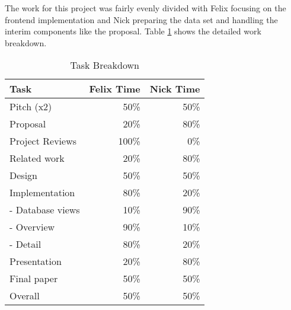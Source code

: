 \documentclass[../manifest.tex]{subfiles}
\begin{document}
The work for this project was fairly evenly divided with Felix focusing on the frontend implementation and Nick preparing the data set and handling the interim components like the proposal. Table \ref{tab:schedule} shows the detailed work breakdown.

\begin{table}[!thb]
  \caption{Task Breakdown}
  \label{tab:schedule}
  \begin{tabular*}{\columnwidth}{ l r r }
    \hline
    \textbf{Task} & \textbf{Felix Time} & \textbf{Nick Time} \\ %
    \hline
    Pitch (x2)                       &  50\% &  50\% \\ %
    Proposal                         &  20\% &  80\%  \\ %
    Project Reviews                  & 100\% &   0\% \\ %
    Related work                     &  20\% &   80\% \\ %
    Design                           &  50\% &   50\% \\
    Implementation                   &  80\% &  20\% \\ %
     - Database views                &  10\% &  90\% \\ %
     - Overview                      &  90\% &  10\% \\ %
     - Detail                        &  80\% &  20\% \\ %
    Presentation                     &  20\% &  80\% \\ %
    Final paper                      &  50\% &  50\% \\ %
    \hline
    \hline
    Overall                          &  50\% &  50\% \\
    \hline
  \end{tabular*}
\end{table}
\end{document}
